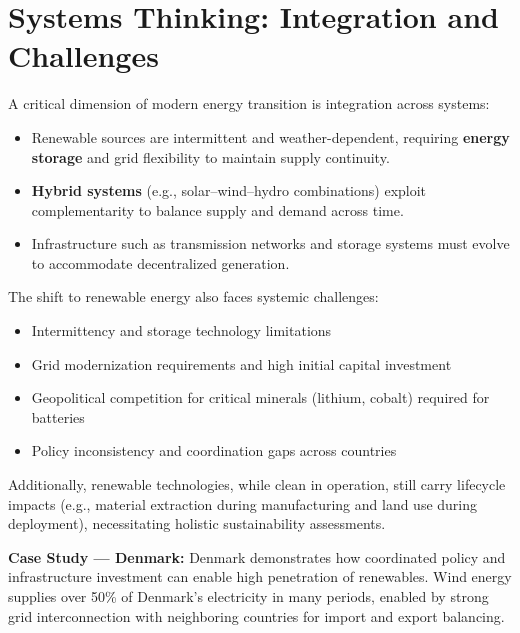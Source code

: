 \documentclass[12pt,a4paper]{article}
\begin{document}
\section{Systems Thinking: Integration and Challenges}

A critical dimension of modern energy transition is integration across systems:
\begin{itemize}
    \item Renewable sources are intermittent and weather-dependent, requiring \textbf{energy storage} and grid flexibility to maintain supply continuity.
    \item \textbf{Hybrid systems} (e.g., solar--wind--hydro combinations) exploit complementarity to balance supply and demand across time.
    \item Infrastructure such as transmission networks and storage systems must evolve to accommodate decentralized generation.
\end{itemize}

The shift to renewable energy also faces systemic challenges:
\begin{itemize}
    \item Intermittency and storage technology limitations
    \item Grid modernization requirements and high initial capital investment
    \item Geopolitical competition for critical minerals (lithium, cobalt) required for batteries
    \item Policy inconsistency and coordination gaps across countries
\end{itemize}

Additionally, renewable technologies, while clean in operation, still carry lifecycle impacts (e.g., material extraction during manufacturing and land use during deployment), necessitating holistic sustainability assessments.

\begin{example}
\textbf{Case Study --- Denmark:} Denmark demonstrates how coordinated policy and infrastructure investment can enable high penetration of renewables. Wind energy supplies over 50\% of Denmark's electricity in many periods, enabled by strong grid interconnection with neighboring countries for import and export balancing.
\end{example}

\end{document}
